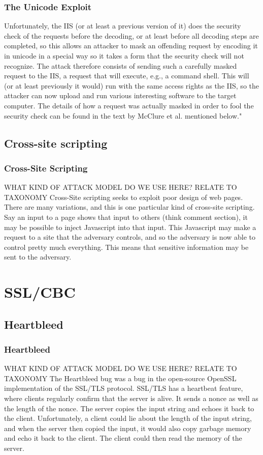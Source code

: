         \begin{frame}
            \frametitle{The Unicode Exploit}
            Unfortunately, the IIS (or at least a previous version of it) does the security check of the requests before the decoding, or at least before all decoding steps are completed, so this allows an attacker to mask an offending request by encoding it in unicode in a special way so it takes a form that the security check will not recognize. The attack therefore consists of sending such a carefully masked request to the IIS, a request that will execute, e.g., a command shell. This will (or at least previously it would) run with the same access rights as the IIS, so the attacker can now upload and run various interesting software to the target computer.
            The details of how a request was actually masked in order to fool the security check can be found in the text by McClure et al. mentioned below."
        
        \end{frame}
\subsection{Cross-site scripting}
        \begin{frame}
            \frametitle{Cross-Site Scripting}
                WHAT KIND OF ATTACK MODEL DO WE USE HERE? RELATE TO TAXONOMY
                Cross-Site scripting seeks to exploit poor design of web pages. There are many variations, and this is one particular kind of cross-site scripting. Say an input to a page shows that input to others (think comment section), it may be possible to inject Javascript into that input. This Javascript may make a request to a site that the adversary controls, and so the adversary is now able to control pretty much everything. This means that sensitive information may be sent to the adversary.  
        \end{frame}

    
\section{SSL/CBC}
    \subsection{Heartbleed}
        \begin{frame}
            \frametitle{Heartbleed}

                WHAT KIND OF ATTACK MODEL DO WE USE HERE? RELATE TO TAXONOMY
                The Heartbleed bug was a bug in the open-source OpenSSL implementation of the SSL/TLS protocol. SSL/TLS has a heartbeat feature, where clients regularly confirm that the server is alive. It sends a nonce as well as the length of the nonce. The server copies the input string and echoes it back to the client. Unfortunately, a client could lie about the length of the input string, and when the server then copied the input, it would also copy garbage memory and echo it back to the client. The client could then read the memory of the server. 
        \end{frame}


